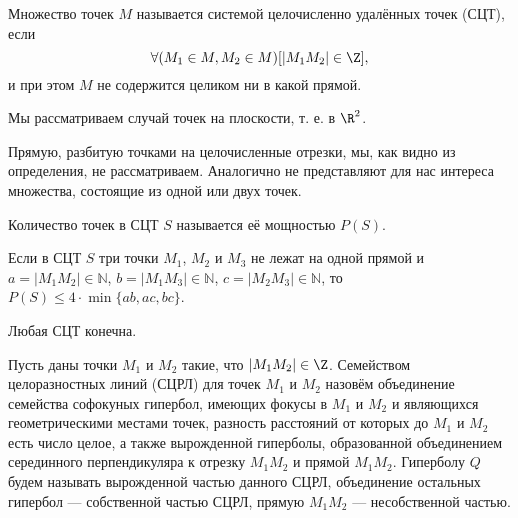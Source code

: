 

\linespread{1.468}
\large

\begin{opr}
	Множество точек $M$ называется системой целочисленно удалённых точек (СЦТ), если
	$$
		\forall(M_1 \in M, M_2\in M)[|M_1 M_2|\in\Z],
	$$
	и при этом $M$ не содержится целиком ни в какой прямой.
\end{opr}

\begin{zamech}
	Мы рассматриваем случай точек на плоскости, т. е. в $\R^2$.
\end{zamech}

\begin{zamech}
	Прямую, разбитую точками на целочисленные отрезки, мы, как видно из определения, не рассматриваем.
	Аналогично не представляют для нас интереса множества, состоящие из одной или двух точек.
\end{zamech}

\begin{opr}
	Количество точек в СЦТ $S$ называется её мощностью $P(S)$.
\end{opr}

\begin{lemma}\label{lemma_Semenova}
	Если в СЦТ $S$ три точки $M_1$, $M_2$ и $M_3$ не лежат на одной прямой и 
	$a=|M_1 M_2| \in \mathbb{N}$,
	$b=|M_1 M_3| \in \mathbb{N}$,
	$c=|M_2 M_3| \in \mathbb{N}$,
	то 
	$P(S) \leq 4\cdot\min\{ab,ac,bc\}$.
\end{lemma}

\begin{sledstvie}
	Любая СЦТ конечна.
\end{sledstvie}

\begin{opr}
	Пусть даны точки $M_1$ и $M_2$ такие, что $|M_1 M_2|\in\Z$.
	Семейством целоразностных линий (СЦРЛ) для точек $M_1$ и $M_2$ назовём объединение семейства софокуных гипербол,
	имеющих фокусы в $M_1$ и $M_2$ и являющихся геометрическими местами точек, разность расстояний от которых до $M_1$ и $M_2$ есть число целое,
	а также вырожденной гиперболы,
	образованной объединением серединного перпендикуляра к отрезку $M_1 M_2$ и прямой $M_1 M_2$.
	Гиперболу $Q$ будем называть вырожденной частью данного СЦРЛ,
	объединение остальных гипербол --- собственной частью СЦРЛ,
	прямую $M_1 M_2$ --- несобственной частью.
\end{opr}

